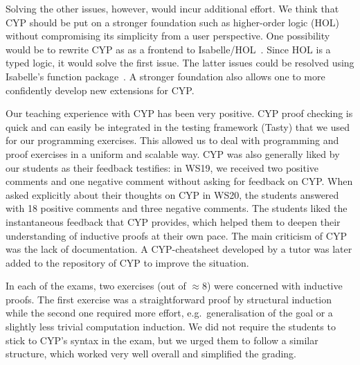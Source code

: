 Solving the other issues, however, would incur additional effort.
We think that CYP should be put on a stronger foundation such as higher-order logic (HOL) without compromising its simplicity from a user perspective.
One possibility would be to rewrite CYP as as a frontend to Isabelle/HOL~\cite{isabelle}.
Since HOL is a typed logic, it would solve the first issue.
The latter issues could be resolved using Isabelle's function package~\cite{isabelle_functions}.
A stronger foundation also allows one to more confidently develop new extensions for CYP.

Our teaching experience with CYP has been very positive.
CYP proof checking is quick and can easily be integrated in the testing framework (Tasty) that we used for our programming exercises.
This allowed us to deal with programming and proof exercises in a uniform and scalable way.
CYP was also generally liked by our students as their feedback testifies:
in WS19,
we received two positive comments and one negative comment without asking for feedback on CYP.
When asked explicitly about their thoughts on CYP in WS20,
the students answered with 18 positive comments and three negative comments.
The students liked the instantaneous feedback that CYP provides,
which helped them to deepen their understanding of inductive proofs at their own pace.
The main criticism of CYP was the lack of documentation.
A CYP-cheatsheet developed by a tutor was later added to the repository of CYP to improve the situation.

In each of the exams, two exercises (out of $\approx 8$) were concerned with inductive proofs.
The first exercise was a straightforward proof by structural induction while the second one required more effort, e.g.\ generalisation of the goal or a slightly less trivial computation induction.
We did not require the students to stick to CYP's syntax in the exam, but we urged them to follow a similar structure,
which worked very well overall and simplified the grading.

